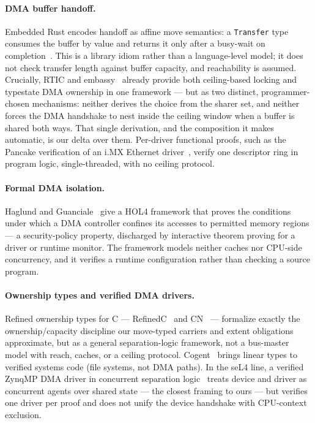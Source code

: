 \documentclass[10pt,twocolumn]{article}
\begin{document}
\paragraph{DMA buffer handoff.} Embedded Rust encodes handoff as affine move
semantics: a \texttt{Transfer} type consumes the buffer by value and returns it
only after a busy-wait on completion~\cite{embedonomicon}. This is a library
idiom rather than a language-level model; it does not check transfer length
against buffer capacity, and reachability is assumed. Crucially, RTIC and
embassy~\cite{embassy} already provide both ceiling-based locking and typestate
DMA ownership in one framework --- but as two distinct, programmer-chosen
mechanisms: neither derives the choice from the sharer set, and neither forces
the DMA handshake to nest inside the ceiling window when a buffer is shared both
ways. That single derivation, and the composition it makes automatic, is our
delta over them. Per-driver functional proofs, such as the Pancake verification
of an i.MX Ethernet driver~\cite{pancake}, verify one descriptor ring in program
logic, single-threaded, with no ceiling protocol.

\paragraph{Formal DMA isolation.} Haglund and Guanciale~\cite{haglund2022} give
a HOL4 framework that proves the conditions under which a DMA controller confines
its accesses to permitted memory regions --- a security-policy property,
discharged by interactive theorem proving for a driver or runtime monitor. The
framework models neither caches nor CPU-side concurrency, and it verifies a
runtime configuration rather than checking a source program.

\paragraph{Ownership types and verified DMA drivers.} Refined ownership types for
C --- RefinedC~\cite{refinedc} and CN~\cite{cn} --- formalize exactly the
ownership/capacity discipline our move-typed carriers and extent obligations
approximate, but as a general separation-logic framework, not a bus-master model
with reach, caches, or a ceiling protocol. Cogent~\cite{cogent} brings linear
types to verified systems code (file systems, not DMA paths). In the seL4 line, a
verified ZynqMP DMA driver in concurrent separation logic~\cite{seldma} treats
device and driver as concurrent agents over shared state --- the closest framing
to ours --- but verifies one driver per proof and does not unify the device
handshake with CPU-context exclusion.
\end{document}
